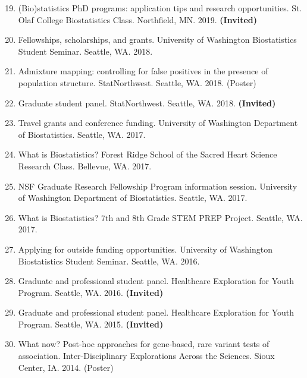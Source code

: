 \documentclass[margin]{res}
\newenvironment{benumerate}[1]{
    \let\oldItem\item
    \def\item{\addtocounter{enumi}{-2}\oldItem}
    
    \begin{enumerate}
    \setcounter{enumi}{#1}
    \addtocounter{enumi}{1}
}{
    \end{enumerate}
}
\begin{document}
\begin{resume}
\begin{benumerate}{18}
\item (Bio)statistics PhD programs: application tips and research opportunities. St. Olaf College Biostatistics Class. Northfield, MN. 2019. \textbf{(Invited)}

\item Fellowships, scholarships, and grants. University of Washington Biostatistics Student Seminar. Seattle, WA. 2018.

\item %
Admixture mapping: controlling for false positives in the presence of population structure. StatNorthwest. Seattle, WA. 2018. (Poster)

\item Graduate student panel. StatNorthwest. Seattle, WA. 2018. \textbf{(Invited)}

\item %
Travel grants and conference funding. University of Washington Department of Biostatistics. Seattle, WA. 2017.

\item %
What is Biostatistics? Forest Ridge School of the Sacred Heart Science Research Class. Bellevue, WA. 2017.

\item %
NSF Graduate Research Fellowship Program information session. University of Washington Department of Biostatistics. Seattle, WA. 2017.

\item %
What is Biostatistics? 7th and 8th Grade STEM PREP Project. Seattle, WA. 2017. %

\item %
Applying for outside funding opportunities. University of Washington Biostatistics Student Seminar. Seattle, WA. 2016.

\item Graduate and professional student panel. Healthcare Exploration for Youth Program. Seattle, WA. 2016. \textbf{(Invited)}

\item Graduate and professional student panel. Healthcare Exploration for Youth Program. Seattle, WA. 2015. \textbf{(Invited)}

\item %
What now? Post-hoc approaches for gene-based, rare variant tests of association. Inter-Disciplinary Explorations Across the Sciences. Sioux Center, IA. 2014.  (Poster)\\
\end{benumerate}



\end{resume}
\end{document}
